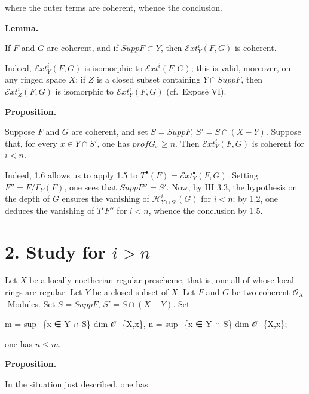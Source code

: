 \documentclass[
  11pt,
  a4paper,
]{book}
\newenvironment{Shaded}{}{}
\newcommand{\NormalTok}[1]{#1}
\begin{document}
where the outer terms are coherent, whence the conclusion.

\textbf{Lemma.}

If \(F\) and \(G\) are coherent, and if \(Supp F \subset Y\), then
\(\mathcal{E}xt^{i}_{Y}(F, G)\) is coherent.

Indeed, \(\mathcal{E}xt^{i}_{Y}(F, G)\) is isomorphic to
\(\mathcal{E}xt^{i}(F, G)\); this is valid, moreover, on any ringed
space \(X\): if \(Z\) is a closed subset containing \(Y \cap Supp F\),
then \(\mathcal{E}xt^{i}_{Z}(F, G)\) is isomorphic to
\(\mathcal{E}xt^{i}_{Y}(F, G)\) (cf.~Exposé VI).

\textbf{Proposition.}

Suppose \(F\) and \(G\) are coherent, and set \(S = Supp F\),
\(S' = S \cap (X - Y)\). Suppose that, for every \(x \in Y \cap
S'\), one has \(prof G_{x} \geqslant n\). Then
\(\mathcal{E}xt^{i}_{Y}(F, G)\) is coherent for \(i < n\).

Indeed, 1.6 allows us to apply 1.5 to
\(T^{\bullet}(F) = \mathcal{E}xt^{\bullet}_{Y}(F, G)\). Setting \(F'' =
F/\Gamma_{Y}(F)\), one sees that \(Supp F'' = S'\). Now, by III 3.3, the
hypothesis on the depth of \(G\) ensures the vanishing of
\(\mathcal{H}^{i}_{Y \cap S'}(G)\) for \(i < n\); by 1.2, one deduces
the vanishing of \(T^{i} F''\) for \(i < n\), whence the conclusion by
1.5.

\section{\texorpdfstring{2. Study for
\(i > n\)}{2. Study for i \textgreater{} n}}\label{study-for-i-n-1}

Let \(X\) be a locally noetherian regular prescheme, that is, one all of
whose local rings are regular. Let \(Y\) be a closed subset of \(X\).
Let \(F\) and \(G\) be two coherent \(\mathcal{O}_{X}\)-Modules. Set
\(S = Supp F\), \(S' = S \cap (X -
Y)\). Set

\begin{Shaded}
\begin{Highlighting}[]
\NormalTok{m = sup\_\{x ∈ Y ∩ S\} dim 𝒪\_\{X,x\},}
\NormalTok{n = sup\_\{x ∈ Y ∩ S\textquotesingle{}\} dim 𝒪\_\{X,x\};}
\end{Highlighting}
\end{Shaded}

one has \(n \leqslant m\).

\textbf{Proposition.}

In the situation just described, one has:
\end{document}
